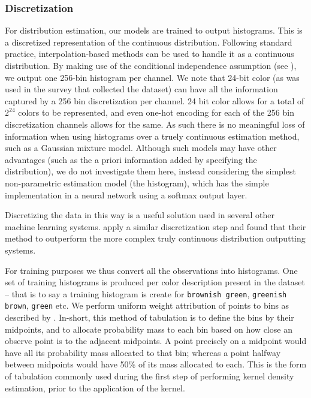 \documentclass[]{book}
\newcommand{\textcite}{\citet}
\newcommand{\natlang}[1]{\texttt{#1}}
\begin{document}
\subsubsection{Discretization} \label{sec:discretization}
For distribution estimation, our models are trained to output histograms.
This is a discretized representation of the continuous distribution.
Following standard practice, interpolation-based methods can be used to handle it as a continuous distribution.
By making use of the conditional independence assumption (see ), we output one 256-bin histogram per channel.
We note that 24-bit color (as was used in the survey that collected the dataset) can have all the information captured by a 256 bin discretization  per channel.
24 bit color allows for a total of $2^{24}$ colors to be represented, and even one-hot encoding for each of the 256 bin discretization channels allows for the same.
As such there is no meaningful loss of information when using histograms over a truely continuous estimation method, such as a Gaussian mixture model.
Although such models may have other advantages (such as the a priori information added by specifying the distribution), we do not investigate them here, instead considering the simplest non-parametric estimation model (the histogram), which has the simple implementation in a neural network using a softmax output layer.

Discretizing the data in this way is a useful solution used in several other machine learning systems.
\textcite{oord2016pixel, DBLP:journals/corr/OordDZSVGKSK16} apply a similar discretization step and found that their method to outperform the more complex truly continuous distribution outputting systems.

For training purposes we thus convert all the observations into histograms.
One set of training histograms is produced per color description present in the dataset -- that is to say a training histogram is create for \natlang{brownish green}, \natlang{greenish brown}, \natlang{green} etc.
We perform uniform weight attribution of points to bins as described by \textcite{jones1984remark}.
In-short, this method of tabulation is to define the bins by their midpoints, and to allocate probability mass to each bin based on how close an observe point is to the adjacent midpoints.
A point precisely on a midpoint would have all its probability mass allocated to that bin;
whereas a point halfway between midpoints would have 50\% of its mass allocated to each.
This is the form of tabulation commonly used during the first step of performing kernel density estimation, prior to the application of the kernel.
\end{document}
